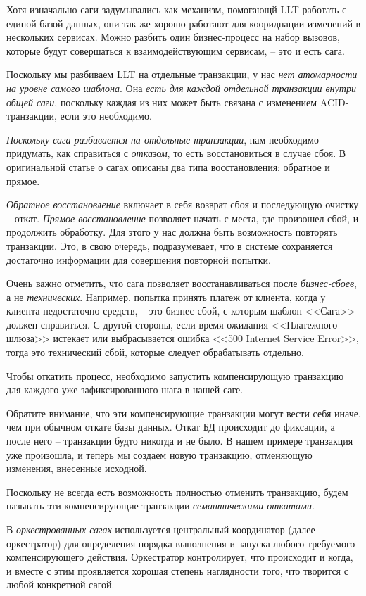 \documentclass[%
	11pt,
	a4paper,
	utf8,
		]{article}
\begin{document}
Хотя изначально саги задумывались как механизм, помогающй LLT работать с единой базой данных, они так же хорошо работают для коориднации изменений в нескольких сервисах. Можно разбить один бизнес-процесс на набор вызовов, которые будут совершаться к взаимодействующим сервисам, -- это и есть сага.

Поскольку мы разбиваем LLT на отдельные транзакции, у нас \emph{нет атомарности на уровне самого шаблона}. Она \emph{\color{blue}есть для каждой отдельной транзакции внутри общей саги}, поскольку каждая из них может быть связана с изменением ACID-транзакции, если это необходимо.

\emph{Поскольку сага разбивается на отдельные транзакции}, нам необходимо придумать, как справиться с \emph{отказом}, то есть восстановиться в случае сбоя. В оригинальной статье о сагах описаны два типа восстановления: обратное и прямое.

\emph{Обратное восстановление} включает в себя возврат сбоя и последующую очистку -- откат. \emph{Прямое восстановление} позволяет начать с места, где произошел сбой, и продолжить обработку. Для этого у нас должна быть возможность повторять транзакции. Это, в свою очередь, подразумевает, что в системе сохраняется достаточно информации для совершения повторной попытки.

Очень важно отметить, что сага позволяет восстанавливаться после \emph{бизнес-сбоев}, а не \emph{технических}. Например, попытка принять платеж от клиента, когда у клиента недостаточно средств, -- это бизнес-сбой, с которым шаблон <<Сага>> должен справиться. С другой стороны, если время ожидания <<Платежного шлюза>> истекает или выбрасывается ошибка <<500 Internet Service Error>>, тогда это технический сбой, которые следует обрабатывать отдельно.

Чтобы откатить процесс, необходимо запустить компенсирующую транзакцию для каждого уже зафиксированного шага в нашей саге.

Обратите внимание, что эти компенсирующие  транзакции могут вести себя иначе, чем при обычном откате базы данных. Откат БД происходит до фиксации, а после него -- транзакции будто никогда и не было. В нашем примере транзакция уже произошла, и теперь мы создаем новую транзакцию, отменяющую изменения, внесенные исходной.

Поскольку не всегда есть возможность полностью отменить транзакцию, будем называть эти компенсирующие транзакции \emph{семантическими откатами}.

В \emph{оркестрованных сагах} используется центральный координатор (далее оркестратор) для определения порядка выполнения и запуска любого требуемого компенсирующего действия. Оркестратор контролирует, что происходит и когда, и вместе с этим проявляется хорошая степень наглядности того, что творится с любой конкретной сагой.
\end{document}

